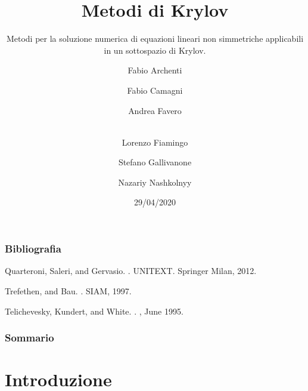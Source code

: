 \documentclass[10pt]{beamer}
\begin{document}
\begin{frame}
  \title{Metodi di Krylov}
  \subtitle{Metodi per la soluzione numerica di equazioni lineari non simmetriche applicabili in un sottospazio di Krylov.}
  \date{29/04/2020}
  \author[Principal]{Fabio Archenti \and Fabio Camagni \and Andrea Favero \and  \\Lorenzo Fiamingo \and Stefano Gallivanone \and Nazariy Nashkolnyy}
  \maketitle
\end{frame}


\begin{frame}
    \frametitle{Bibliografia}
    
  \begin{thebibliography}{99}\small
    Quarteroni, Saleri, and Gervasio.
    .
    \newblock UNITEXT. Springer Milan, 2012.

    Trefethen, and Bau.
    .
    \newblock SIAM, 1997.
    
   
   Telichevesky, Kundert, and White.
   .
   , June 1995.

   \end{thebibliography}

  
\end{frame}  

\begin{frame}
  \frametitle{Sommario}
  \tableofcontents
\end{frame}

\section{Introduzione}\label{sec:sec1}
\end{document}
